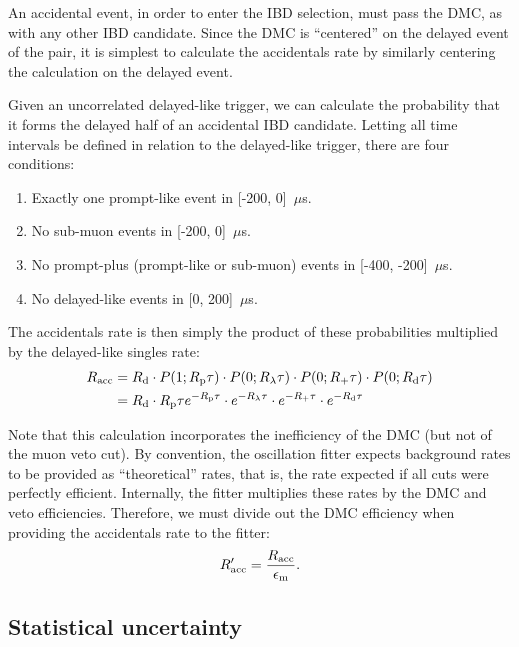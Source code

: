 \documentclass[../thesis.tex]{subfiles}
\begin{document}
An accidental event, in order to enter the IBD selection, must pass the DMC, as with any other IBD candidate. Since the DMC is ``centered'' on the delayed event of the pair, it is simplest to calculate the accidentals rate by similarly centering the calculation on the delayed event.

Given an uncorrelated delayed-like trigger, we can calculate the probability that it forms the delayed half of an accidental IBD candidate. Letting all time intervals be defined in relation to the delayed-like trigger, there are four conditions:
\begin{enumerate}
\item Exactly one prompt-like event in [-200, 0]~$\mu$s.
\item No sub-muon events in [-200, 0]~$\mu$s.
\item No prompt-plus (prompt-like or sub-muon) events in [-400, -200]~$\mu$s.
\item No delayed-like events in [0, 200]~$\mu$s.
\end{enumerate}
The accidentals rate is then simply the product of these probabilities multiplied by the delayed-like singles rate:
\begin{align}
  \label{eq:accRate}
  R_\mathrm{acc} &= R_\mathrm{d} \cdot P(1; R_\mathrm{p} \tau)\cdot P(0; R_\mathrm{\lambda} \tau)
           \cdot P(0; R_\mathrm{+} \tau)\cdot P(0; R_\mathrm{d} \tau) \nonumber \\
        &= R_\mathrm{d}\cdot R_\mathrm{p}\tau e^{-R_\mathrm{p}\tau}\cdot e^{-R_\mathrm{\lambda}\tau}
           \cdot e^{-R_\mathrm{+}\tau} \cdot e^{-R_\mathrm{d}\tau}
\end{align}

Note that this calculation incorporates the inefficiency of the DMC (but not of the muon veto cut). By convention, the oscillation fitter expects background rates to be provided as ``theoretical'' rates, that is, the rate expected if all cuts were perfectly efficient. Internally, the fitter multiplies these rates by the DMC and veto efficiencies. Therefore, we must divide out the DMC efficiency when providing the accidentals rate to the fitter:
\begin{equation}
  R_\mathrm{acc}' = \frac{R_\mathrm{acc}}{\epsilon_\mathrm{m}}.
\end{equation}

\subsection{Statistical uncertainty}
\label{sec:accStatUnc}
\end{document}
